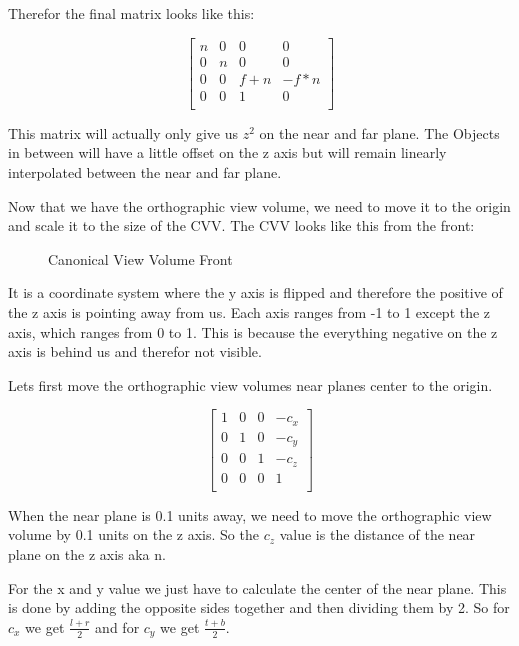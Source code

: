 \documentclass[12pt]{report} \usepackage{preamble}
\begin{document}
Therefor the final matrix looks like this:

\[
	\begin{bmatrix}
		n & 0 & 0     & 0      \\
		0 & n & 0     & 0      \\
		0 & 0 & f + n & -f * n \\
		0 & 0 & 1     & 0      \\
	\end{bmatrix}
\]

This matrix will actually only give us \(z^2\) on the near and far plane. The Objects in between will have
a little offset on the z axis but will remain linearly interpolated between the near and far plane.

Now that we have the orthographic view volume, we need to move it to the origin and
scale it to the size of the CVV. The CVV looks like this from the front:

\begin{figure}[hbtp]
	\centering 
	\caption{Canonical View Volume Front}
\end{figure} \FloatBarrier

It is a coordinate system where the y axis is flipped and therefore the positive of the z axis
is pointing away from us. Each axis ranges from -1 to 1 except the z axis,
which ranges from 0 to 1. This is because the everything negative on the z axis
is behind us and therefor not visible.

Lets first move the orthographic view volumes near planes center to the origin.

\[
	\begin{bmatrix}
		1 & 0 & 0 & -c_x \\
		0 & 1 & 0 & -c_y \\
		0 & 0 & 1 & -c_z \\
		0 & 0 & 0 & 1    \\
	\end{bmatrix}
\]


When the near plane is 0.1 units away, we need to move the orthographic view volume
by 0.1 units on the z axis. So the \(c_z\) value is the distance of the near
plane on the z axis aka n.

For the x and y value we just have to calculate the center of the near plane.
This is done by adding the opposite sides together and then dividing them by 2.
So for \(c_x\) we get \(\frac{l + r}{2}\) and for \(c_y\) we get \(\frac{t + b}{2}\).
\end{document}
